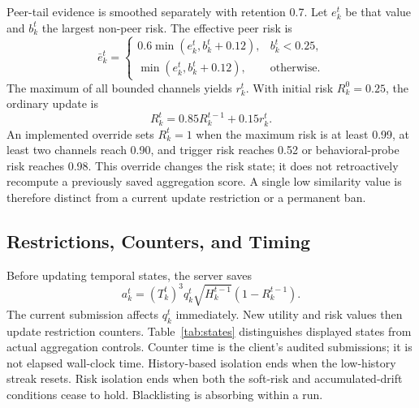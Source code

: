 \documentclass[conference,compsoc]{IEEEtran}
\begin{document}
Peer-tail evidence is smoothed separately with retention 0.7. Let $e_k^t$ be that value and $b_k^t$ the largest non-peer risk. The effective peer risk is
\begin{equation}
 \bar e_k^t=\begin{cases}
 0.6\min(e_k^t,b_k^t+0.12),&b_k^t<0.25,\\
 \min(e_k^t,b_k^t+0.12),&\text{otherwise}.
 \end{cases}
\end{equation}
The maximum of all bounded channels yields $r_k^t$. With initial risk $R_k^0=0.25$, the ordinary update is
\begin{equation}\label{eq:risk}
 R_k^t=0.85R_k^{t-1}+0.15r_k^t.
\end{equation}
An implemented override sets $R_k^t=1$ when the maximum risk is at least 0.99, at least two channels reach 0.90, and trigger risk reaches 0.52 or behavioral-probe risk reaches 0.98. This override changes the risk state; it does not retroactively recompute a previously saved aggregation score. A single low similarity value is therefore distinct from a current update restriction or a permanent ban.

\subsection{Restrictions, Counters, and Timing}
Before updating temporal states, the server saves
\begin{equation}\label{eq:score}
 a_k^t=(T_k^t)^3q_k^t\sqrt{H_k^{t-1}}(1-R_k^{t-1}).
\end{equation}
The current submission affects $q_k^t$ immediately. New utility and risk values then update restriction counters. Table~\ref{tab:states} distinguishes displayed states from actual aggregation controls. Counter time is the client's audited submissions; it is not elapsed wall-clock time. History-based isolation ends when the low-history streak resets. Risk isolation ends when both the soft-risk and accumulated-drift conditions cease to hold. Blacklisting is absorbing within a run.
\end{document}
